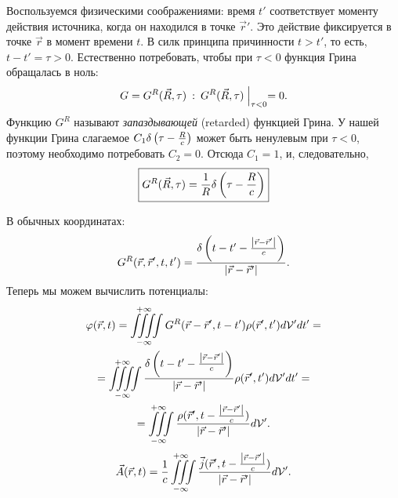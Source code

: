     Воспользуемся физическими соображениями: время $t'$ соответствует моменту действия источника, когда он находился в точке $\vec{r}'$.
    Это действие фиксируется в точке $\vec{r}$ в момент времени $t$. В силк принципа причинности $t > t'$, то есть,
    $t - t' = \tau > 0$. Естественно потребовать, чтобы при $\tau < 0$ функция Грина обращалась в ноль:
    \[
        G = G^R(\vec{R}, \tau) \: : \: G^R(\vec{R}, \tau)\Bigm|_{\tau < 0} = 0.
    \]
    Функцию $G^R$ называют \textit{запаздывающей} (retarded) функцией Грина.
    У нашей функции Грина слагаемое $C_1\delta\left({\tau - \frac Rc}\right)$ может быть ненулевым при $\tau < 0$,
    поэтому необходимо потребовать $C_2 = 0$. Отсюда $C_1 = 1$, и, следовательно,
    \begin{equation}
        \boxed{G^R(\vec{R}, \tau) = \frac 1R \delta\left({\tau - \frac Rc}\right)} \label{Retarded_func}
    \end{equation}

    В обычных координатах:
    \[
        G^R(\vec{r}, \vec{r}', t, t') = \frac{\delta\left({t - t' - \frac{\left|{\vec{r} - \vec{r}'}\right|}{c}}\right)}{\left|{\vec{r} - \vec{r}'}\right|}.
    \]
    Теперь мы можем вычислить потенциалы:
    \begin{gather*}
        \varphi(\vec{r}, t) = \iiiint\limits_{-\infty}^{+\infty} G^R(\vec{r} - \vec{r}', t - t')\rho(\vec{r}', t')d\mathcal{V}'dt' = \\ =
        \iiiint\limits_{-\infty}^{+\infty} \frac{\delta\left({t - t' - \frac{\left|{\vec{r} - \vec{r}'}\right|}{c}}\right)}{\left|{\vec{r} - \vec{r}'}\right|}\rho(\vec{r}', t')d\mathcal{V}'dt' = \\ =
        \iiint\limits_{-\infty}^{+\infty} \frac{\rho(\vec{r}', t - \frac{\left|{\vec{r} - \vec{r}'}\right|}{c})}{\left|{\vec{r} - \vec{r}'}\right|}d\mathcal{V}'.
    \end{gather*}
    \begin{equation}
        \vec{A}(\vec{r}, t) = \frac 1c \iiint\limits_{-\infty}^{+\infty} \frac{\vec{j}(\vec{r}', t - \frac{\left|{\vec{r} - \vec{r}'}\right|}{c})}{\left|{\vec{r} - \vec{r}'}\right|}d\mathcal{V}'. \label{RetardedPotent}
    \end{equation}
    
